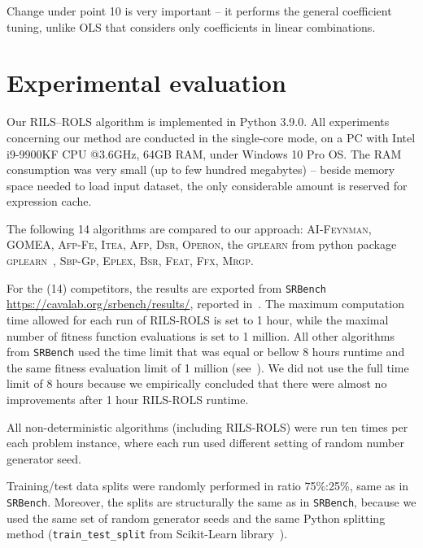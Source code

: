\documentclass{bmcart}
\begin{document}
Change under point 10 is very important -- it performs the general coefficient tuning, unlike OLS that considers only coefficients in linear combinations.  

\section{Experimental evaluation}\label{sec:experiments}

Our \textsc{RILS}--\textsc{ROLS} algorithm is implemented in Python 3.9.0. All experiments concerning our method are conducted in the single-core mode, on a PC with Intel i9-9900KF CPU @3.6GHz, 64GB RAM, under Windows 10 Pro OS. The RAM consumption was very small (up to few hundred megabytes) -- beside memory space needed to load input dataset, the only considerable amount is reserved for expression cache. 


The following 14 algorithms are compared to our approach: \textsc{AI-Feynman}, \textsc{GOMEA}, \textsc{Afp-Fe}, \textsc{Itea}, \textsc{Afp}, \textsc{Dsr}, \textsc{Operon}, the \textsc{gplearn} from python package \textsc{gplearn}~\cite{stephens2016genetic}, \textsc{Sbp-Gp}, \textsc{Eplex}, \textsc{Bsr}, \textsc{Feat}, \textsc{Ffx}, \textsc{Mrgp}. 

For the (14) competitors, the results are exported from \texttt{SRBench} \url{https://cavalab.org/srbench/results/}, reported in~\cite{la2021contemporary}. 
The maximum computation time allowed for each run of \textsc{RILS}-\textsc{ROLS} is set to 1 hour, while the maximal number of fitness function evaluations is set to 1 million. All other algorithms from \texttt{SRBench} used the time limit that was equal or bellow 8 hours runtime and the same fitness evaluation limit of 1 million (see~\cite{la2021contemporary}). We did not use the full time limit of 8 hours because we empirically concluded that there were almost no improvements after 1 hour \textsc{RILS}-\textsc{ROLS} runtime.

All non-deterministic algorithms (including \textsc{RILS}-\textsc{ROLS}) were run ten times per each problem instance, where each run used different setting of random number generator seed. 

Training/test data splits were randomly performed in ratio 75\%:25\%, same as in \texttt{SRBench}. Moreover, the splits are structurally the same as in \texttt{SRBench}, because we used the same set of random generator seeds and the same Python splitting method (\texttt{train\_test\_split} from Scikit-Learn library~\cite{scikit-learn}). 
\end{document}
